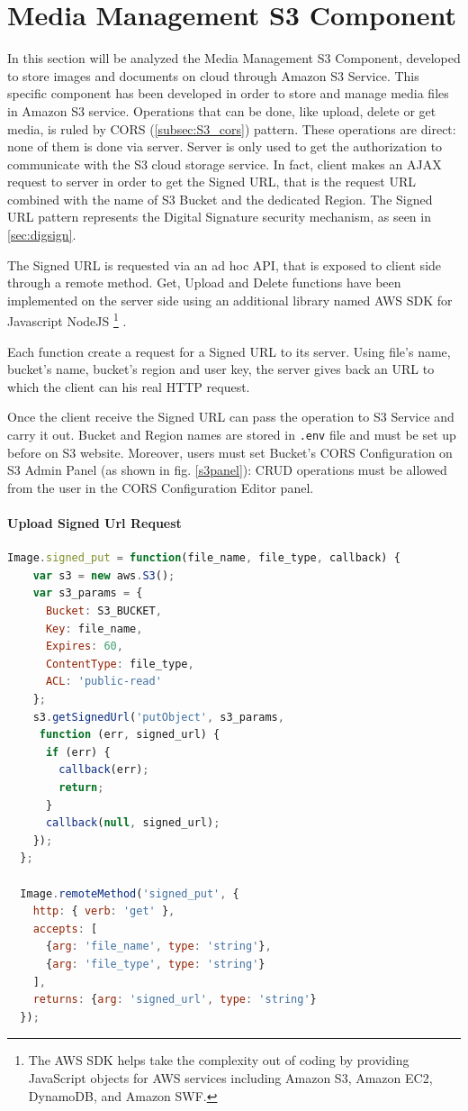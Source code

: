 \section{Media Management S3 Component}
\label{sec:S3_component}

In this section will be analyzed the Media Management S3 Component, developed to store images and documents on cloud through Amazon S3 Service.
This specific component has been developed in order to store and manage media files in Amazon S3 service.
Operations that can be done, like upload, delete or get media, is ruled by CORS (\ref{subsec:S3_cors}) pattern.
These operations are direct: none of them is done via server. Server is only used to get the authorization to communicate with the S3 cloud storage service.
In fact, client makes an AJAX request to server in order to get the Signed URL, that is the request URL combined with the name of S3 Bucket and the dedicated Region.
The Signed URL pattern represents the Digital Signature security mechanism, as seen in \ref{sec:digsign}.

The Signed URL is requested via an ad hoc API, that is exposed to client side through a remote method.
Get, Upload and Delete functions have been implemented on the server side using an additional library named AWS SDK for Javascript NodeJS \footnote{ The AWS SDK helps take the complexity out of coding by providing JavaScript objects for AWS services including Amazon S3, Amazon EC2, DynamoDB, and Amazon SWF.} \cite{s3_aws_sdk}.

Each function create a request for a Signed URL to its server.
Using file's name, bucket's name, bucket's region and user key, the server gives back an URL to which the client can his real HTTP request.

Once the client receive the Signed URL can pass the operation to S3 Service and carry it out.
Bucket and Region names are stored in \texttt{.env} file and must be set up before on S3 website.
Moreover, users must set Bucket's CORS Configuration on S3 Admin Panel (as shown in fig. \ref{s3panel}): CRUD operations must be allowed from the user in the CORS Configuration Editor panel.


\paragraph{Upload Signed Url Request}

\begin{lstlisting}[language=javascript]
Image.signed_put = function(file_name, file_type, callback) {
    var s3 = new aws.S3();
    var s3_params = {
      Bucket: S3_BUCKET,
      Key: file_name,
      Expires: 60,
      ContentType: file_type,
      ACL: 'public-read'
    };
    s3.getSignedUrl('putObject', s3_params,
     function (err, signed_url) {
      if (err) {
        callback(err);
        return;
      }
      callback(null, signed_url);
    });
  };

  Image.remoteMethod('signed_put', {
    http: { verb: 'get' },
    accepts: [
      {arg: 'file_name', type: 'string'},
      {arg: 'file_type', type: 'string'}
    ],
    returns: {arg: 'signed_url', type: 'string'}
  });
\end{lstlisting}

